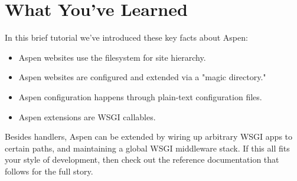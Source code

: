 \section{What You've Learned \label{tutorial-learned}}

In this brief tutorial we've introduced these key facts about Aspen:

\begin{itemize}
\item{Aspen websites use the filesystem for site hierarchy.}
\item{Aspen websites are configured and extended via a "magic directory."}
\item{Aspen configuration happens through plain-text configuration files.}
\item{Aspen extensions are WSGI callables.}
\end{itemize}

Besides handlers, Aspen can be extended by wiring up arbitrary WSGI apps to
certain paths, and maintaining a global WSGI middleware stack. If this all fits
your style of development, then check out the reference documentation that
follows for the full story.

